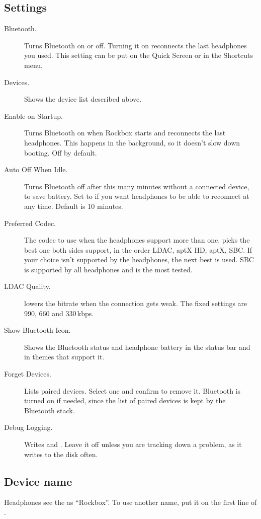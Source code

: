 \subsection{Settings}
\begin{description}
  \item[Bluetooth.] Turns Bluetooth on or off. Turning it on reconnects the
    last headphones you used. This setting can be put on the Quick Screen or in
    the Shortcuts menu.
  \item[Devices.] Shows the device list described above.
  \item[Enable on Startup.] Turns Bluetooth on when Rockbox starts and
    reconnects the last headphones. This happens in the background, so it
    doesn't slow down booting. Off by default.
  \item[Auto Off When Idle.] Turns Bluetooth off after this many minutes
    without a connected device, to save battery. Set to  if you
    want headphones to be able to reconnect at any time. Default is 10 minutes.
  \item[Preferred Codec.] The codec to use when the headphones support more
    than one.  picks the best one both sides support, in the
    order LDAC, aptX HD, aptX, SBC. If your choice isn't supported by the
    headphones, the next best is used. SBC is supported by all headphones and
    is the most tested.
  \item[LDAC Quality.]  lowers the bitrate when the
    connection gets weak. The fixed settings are 990, 660 and 330\,kbps.
  \item[Show Bluetooth Icon.] Shows the Bluetooth status and headphone battery
    in the status bar and in themes that support it.
  \item[Forget Devices.] Lists paired devices. Select one and confirm to
    remove it. Bluetooth is turned on if needed, since the list of paired
    devices is kept by the Bluetooth stack.
  \item[Debug Logging.] Writes  and
    . Leave it off unless you are tracking down
    a problem, as it writes to the disk often.
\end{description}

\subsection{Device name}
Headphones see the \dap{} as ``Rockbox''. To use another name, put it on the
first line of .

